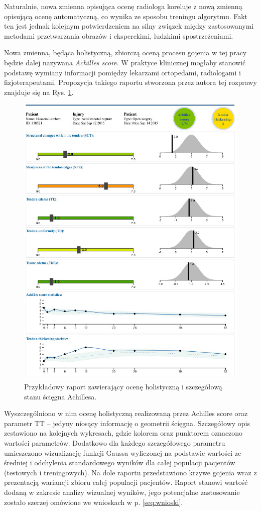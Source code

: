 Naturalnie, nowa zmienna opisująca ocenę radiologa koreluje z nową zmienną opisującą ocenę automatyczną, co wynika ze sposobu treningu algorytmu. Fakt ten jest jednak kolejnym potwierdzeniem na silny związek między zastosowanymi metodami przetwarzania obrazów i eksperckimi, ludzkimi spostrzeżeniami.

Nowa zmienna, będąca holistyczną, zbiorczą oceną procesu gojenia w tej pracy będzie dalej nazywana \textit{Achilles score}. W praktyce klinicznej mogłaby stanowić podstawę wymiany informacji pomiędzy lekarzami ortopedami, radiologami i fizjoterapeutami. Propozycja takiego raportu stworzona przez autora tej rozprawy znajduje się na Rys. \ref{fig:raport}. 
\begin{figure}[h!]
	\centering
	\includegraphics[width=1\textwidth]{figures/raport.png}
	\caption{Przykładowy raport zawierający ocenę holistyczną i szczegółową stanu ścięgna Achillesa.}\label{fig:raport}
\end{figure}
Wyszczególniono w nim ocenę holistyczną realizowaną przez Achilles score oraz parametr TT -- jedyny niosący informację o geometrii ścięgna. Szczegółowy opis zestawiono na kolejnych wykresach, gdzie kolorem oraz punktorem oznaczono wartości parametrów. Dodatkowo dla każdego szczegółowego parametru umieszczono wizualizację funkcji Gaussa wyliczonej na podstawie wartości ze średniej i odchylenia standardowego wyników dla całej populacji pacjentów (testowych i treningowych). Na dole raportu przedstawiono krzywe gojenia wraz z prezentacją wariancji zbioru całej populacji pacjentów. Raport stanowi wartość dodaną w zakresie analizy wizualnej wyników, jego potencjalne zastosowanie zostało szerzej omówione we wnioskach w p. \ref{seq:wnioski}. 

